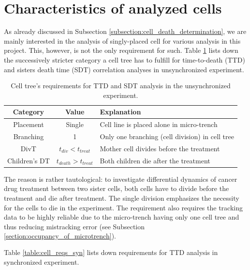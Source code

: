 \documentclass[pdftex,12pt,a4paper]{report}
\begin{document}
\section{Characteristics of analyzed cells}

As already discussed in Subsection \ref{subsection:cell_death_determination}, we are mainly interested in the analysis of singly-placed cell  for various analysis in this project. This, however, is not the only requirement for such. Table \ref{table:cell_reqs_main} lists down the successively stricter category a cell tree has to fulfill for time-to-death (TTD) and sisters death time (SDT) correlation analyses in unsynchronized experiment.

\begin{table}[H]
\centering
\begin{tabular}{ c | c | l }
\hline
Category & Value & Explanation \\
\hline\hline
Placement & Single & Cell line is placed alone in micro-trench \\
Branching & 1 & Only one branching (cell division) in cell tree \\
DivT & $t_{div} < t_{treat}$ & Mother cell divides before the treatment\\
Children's DT & $t_{death} > t_{treat}$  & Both children die after the treatment
\end{tabular}
\caption[Cell tree's requirements for TTD and SDT analysis in the unsynchronized experiment]{Cell tree's requirements for TTD and SDT analysis in the unsynchronized experiment.}
\label{table:cell_reqs_main}
\end{table}

The reason is rather tautological: to investigate differential dynamics of cancer drug treatment between two sister cells, both cells have to divide before the treatment and die after treatment. The single division emphasizes the necessity for the cells to die in the experiment. The requirement also requires the tracking data to be highly reliable due to the micro-trench having only one cell tree and thus reducing mistracking error (see Subsection \ref{section:occupancy_of_microtrench}).

Table \ref{table:cell_reqs_syn} lists down requirements for TTD analysis in synchronized experiment.

\end{document}
